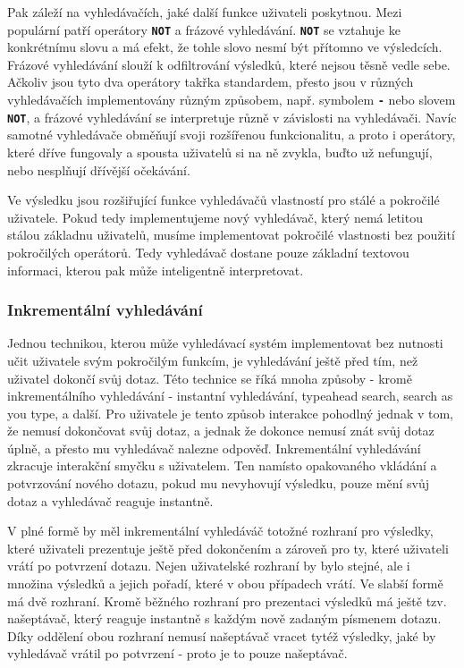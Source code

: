 \documentclass[11pt,letterpaper,oneside,openright]{book}
\newcommand{\bftt}[1]{\texttt{\textbf{#1}}}
\begin{document}
Pak záleží na vyhledávačích, jaké další funkce uživateli poskytnou. Mezi
populární patří operátory \bftt{NOT} a frázové vyhledávání. \bftt{NOT} se
vztahuje ke konkrétnímu slovu a má efekt, že tohle slovo nesmí být přítomno ve
výsledcích. Frázové vyhledávání slouží k odfiltrování výsledků, které nejsou
těsně vedle sebe. Ačkoliv jsou tyto dva operátory takřka standardem, přesto
jsou v různých vyhledávačích implementovány různým způsobem, např. symbolem
\bftt{-} nebo slovem \bftt{NOT}, a frázové vyhledávání se interpretuje různě v
závislosti na vyhledávači. Navíc samotné vyhledávače obměňují svoji rozšířenou
funkcionalitu, a proto i operátory, které dříve fungovaly a spousta uživatelů
si na ně zvykla, buďto už nefungují, nebo nesplňují dřívější očekávání.

Ve výsledku jsou rozšiřující funkce vyhledávačů vlastností pro stálé a
pokročilé uživatele. Pokud tedy implementujeme nový vyhledávač, který nemá
letitou stálou základnu uživatelů, musíme implementovat pokročilé vlastnosti
bez použití pokročilých operátorů. Tedy vyhledávač dostane pouze základní
textovou informaci, kterou pak může inteligentně interpretovat.

\subsubsection{Inkrementální vyhledávání}
Jednou technikou, kterou může vyhledávací systém implementovat bez nutnosti
učit uživatele svým pokročilým funkcím, je vyhledávání ještě před tím, než
uživatel dokončí svůj dotaz. Této technice se říká mnoha způsoby - kromě
inkrementálního vyhledávání - instantní vyhledávání, typeahead search, search
as you type, a další. Pro uživatele je tento způsob interakce pohodlný jednak v
tom, že nemusí dokončovat svůj dotaz, a jednak že dokonce nemusí znát svůj
dotaz úplně, a přesto mu vyhledávač nalezne odpověď. Inkrementální vyhledávání
zkracuje interakční smyčku s uživatelem. Ten namísto opakovaného vkládání a
potvrzování nového dotazu, pokud mu nevyhovují výsledku, pouze mění svůj dotaz
a vyhledávač reaguje instantně.

V plné formě by měl inkrementální vyhledáváč totožné rozhraní pro výsledky,
které uživateli prezentuje ještě před dokončením a zároveň pro ty, které
uživateli vrátí po potvrzení dotazu. Nejen uživatelské rozhraní by bylo stejné,
ale i množina výsledků a jejich pořadí, které v obou případech vrátí. Ve slabší
formě má dvě rozhraní. Kromě běžného rozhraní pro prezentaci výsledků má ještě
tzv. našeptávač, který reaguje instantně s každým nově zadaným písmenem dotazu.
Díky oddělení obou rozhraní nemusí našeptávač vracet tytéž výsledky, jaké by
vyhledávač vrátil po potvrzení - proto je to pouze našeptávač.
\end{document}
